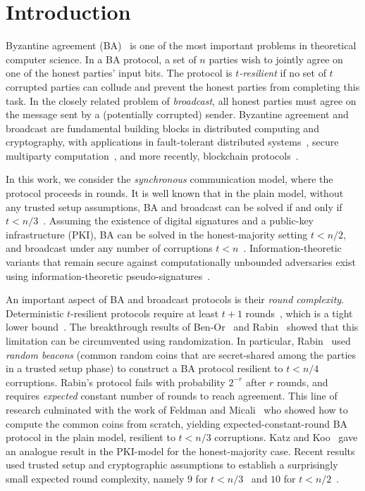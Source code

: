 \section{Introduction}\label{sec:intro}

Byzantine agreement (BA)~\cite{PSL80,LSP82} is one of the most important problems in theoretical computer science. In a BA protocol, a set of $n$ parties wish to jointly agree on one of the honest parties' input bits.
The protocol is \emph{$t$-resilient} if no set of $t$ corrupted parties can collude and prevent the honest parties from completing this task.
In the closely related problem of \emph{broadcast}, all honest parties must agree on the message sent by a (potentially corrupted) sender.
Byzantine agreement and broadcast are fundamental building blocks in distributed computing and cryptography, with applications in fault-tolerant distributed systems~\cite{CL99,KBCCEGGRWWWZ00}, secure multiparty computation~\cite{Yao82,GMW87,BGW88,CCD88}, and more recently, blockchain protocols~\cite{SM16,GHMVZ17,PS18}.

In this work, we consider the \emph{synchronous} communication model, where the protocol proceeds in rounds. It is well known that in the plain model, without any trusted setup assumptions, BA and broadcast can be solved if and only if $t<n/3$~\cite{PSL80,LSP82,FLM85,GM93}. Assuming the existence of digital signatures and a public-key infrastructure (PKI), BA can be solved in the honest-majority setting $t<n/2$, and broadcast under any number of corruptions $t<n$~\cite{DS83}. Information-theoretic variants that remain secure against computationally unbounded adversaries exist using information-theoretic pseudo-signatures~\cite{PW92}.

An important aspect of BA and broadcast protocols is their \emph{round complexity}. Deterministic $t$-resilient protocols require at least $t+1$ rounds~\cite{FL82,DS83}, which is a tight lower bound~\cite{DS83,GM93}. The breakthrough results of Ben-Or~\cite{Ben-Or83} and Rabin~\cite{Rabin83} showed that this limitation can be circumvented using randomization. In particular, Rabin~\cite{Rabin83} used \emph{random beacons} (common random coins that are secret-shared among the parties in a trusted setup phase) to construct a BA protocol resilient to $t<n/4$ corruptions. Rabin's protocol fails with probability $2^{-r}$ after $r$ rounds, and requires \emph{expected} constant number of rounds to reach agreement. This line of research culminated with the work of Feldman and Micali~\cite{FM97} who showed how to compute the common coins from scratch, yielding expected-constant-round BA protocol in the plain model, resilient to $t<n/3$ corruptions. Katz and Koo~\cite{KK06} gave an analogue result in the PKI-model for the honest-majority case. Recent results used trusted setup and cryptographic assumptions to establish a surprisingly small expected round complexity, namely $9$ for $t<n/3$~\cite{Micali17} and $10$ for $t<n/2$~\cite{MV17,ADDNR19}.

